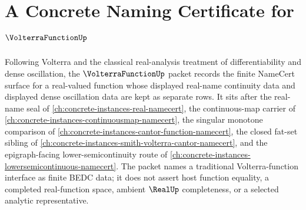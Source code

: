 \chapter{A Concrete Naming Certificate for $\VolterraFunctionUp$}
\label{ch:concrete-instances-volterra-function-namecert}

Following Volterra and the classical real-analysis treatment of differentiability and dense oscillation, the $\VolterraFunctionUp$ packet records the finite NameCert surface for a real-valued function whose displayed real-name continuity data and displayed dense oscillation data are kept as separate rows. It sits after the real-name seal of \autoref{ch:concrete-instances-real-namecert}, the continuous-map carrier of \autoref{ch:concrete-instances-continuousmap-namecert}, the singular monotone comparison of \autoref{ch:concrete-instances-cantor-function-namecert}, the closed fat-set sibling of \autoref{ch:concrete-instances-smith-volterra-cantor-namecert}, and the epigraph-facing lower-semicontinuity route of \autoref{ch:concrete-instances-lowersemicontinuous-namecert}. The packet names a traditional Volterra-function interface as finite BEDC data; it does not assert host function equality, a completed real-function space, ambient $\RealUp$ completeness, or a selected analytic representative.

